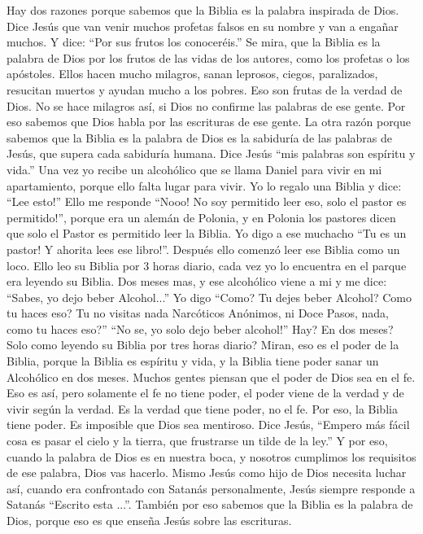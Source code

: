 Hay dos razones porque sabemos que la Biblia es la palabra inspirada de
Dios. Dice Jesús que van venir muchos profetas falsos en su nombre y van
a engañar muchos. Y dice: ``Por sus frutos los conoceréis.'' Se mira,
que la Biblia es la palabra de Dios por los frutos de las vidas de los
autores, como los profetas o los apóstoles. Ellos hacen mucho milagros,
sanan leprosos, ciegos, paralizados, resucitan muertos y ayudan mucho a
los pobres. Eso son frutas de la verdad de Dios. No se hace milagros
así, si Dios no confirme las palabras de ese gente. Por eso sabemos que
Dios habla por las escrituras de ese gente. La otra razón porque sabemos
que la Biblia es la palabra de Dios es la sabiduría de las palabras de
Jesús, que supera cada sabiduría humana. Dice Jesús ``mis palabras son
espíritu y vida.'' Una vez yo recibe un alcohólico que se llama Daniel
para vivir en mi apartamiento, porque ello falta lugar para vivir. Yo lo
regalo una Biblia y dice: ``Lee esto!'' Ello me responde ``Nooo! No soy
permitido leer eso, solo el pastor es permitido!'', porque era un alemán
de Polonia, y en Polonia los pastores dicen que solo el Pastor es
permitido leer la Biblia. Yo digo a ese muchacho ``Tu es un pastor! Y
ahorita lees ese libro!''. Después ello comenzó leer ese Biblia como un
loco. Ello leo su Biblia por 3 horas diario, cada vez yo lo encuentra en
el parque era leyendo su Biblia. Dos meses mas, y ese alcohólico viene a
mi y me dice: ``Sabes, yo dejo beber Alcohol...'' Yo digo ``Como? Tu
dejes beber Alcohol? Como tu haces eso? Tu no visitas nada Narcóticos
Anónimos, ni Doce Pasos, nada, como tu haces eso?'' ``No se, yo solo
dejo beber alcohol!'' Hay? En dos meses? Solo como leyendo su Biblia por
tres horas diario? Miran, eso es el poder de la Biblia, porque la Biblia
es espíritu y vida, y la Biblia tiene poder sanar un Alcohólico en dos
meses. Muchos gentes piensan que el poder de Dios sea en el fe. Eso es
así, pero solamente el fe no tiene poder, el poder viene de la verdad y
de vivir según la verdad. Es la verdad que tiene poder, no el fe. Por
eso, la Biblia tiene poder. Es imposible que Dios sea mentiroso. Dice
Jesús, ``Empero más fácil cosa es pasar el cielo y la tierra, que
frustrarse un tilde de la ley.'' Y por eso, cuando la palabra de Dios es
en nuestra boca, y nosotros cumplimos los requisitos de ese palabra,
Dios vas hacerlo. Mismo Jesús como hijo de Dios necesita luchar así,
cuando era confrontado con Satanás personalmente, Jesús siempre responde
a Satanás ``Escrito esta ...''. También por eso sabemos que la Biblia es
la palabra de Dios, porque eso es que enseña Jesús sobre las escrituras.
